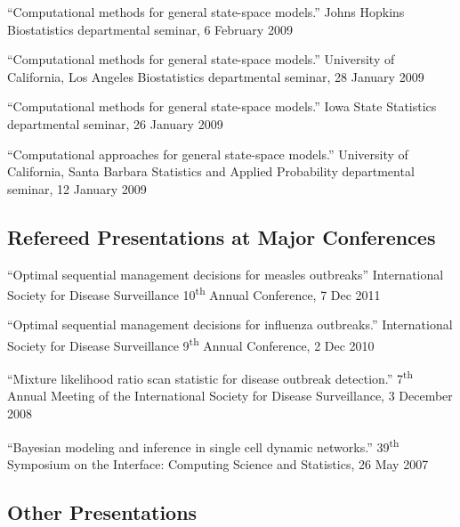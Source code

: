 \documentclass[overlapped,line]{res}
\newcommand{\sinceappt}{}
\begin{document}
\begin{resume}
{``Computational methods for general state-space models.'' Johns Hopkins Biostatistics departmental seminar, 6 February 2009 

``Computational methods for general state-space models.'' University of California, Los Angeles Biostatistics departmental seminar, 28 January 2009 

``Computational methods for general state-space models.'' Iowa State Statistics  departmental seminar, 26 January 2009 

``Computational approaches for general state-space models.'' University of California, Santa Barbara Statistics and Applied Probability departmental seminar, 12 January 2009 
}

\subsection{\bf Refereed Presentations at Major Conferences} \vspace{-0.2in}

{\small 

``Optimal sequential management decisions for measles outbreaks'' International Society for Disease Surveillance 10\textsuperscript{th} Annual Conference, 7 Dec 2011 

\sinceappt

``Optimal sequential management decisions for influenza outbreaks.'' International Society for Disease Surveillance 9\textsuperscript{th} Annual Conference, 2 Dec 2010 

``Mixture likelihood ratio scan statistic for disease outbreak detection.'' 7\textsuperscript{th} Annual Meeting of the International Society for Disease Surveillance, 3 December 2008 

``Bayesian modeling and inference in single cell dynamic networks.'' 39\textsuperscript{th} Symposium on the Interface: Computing Science and Statistics, 26 May 2007 

}

\subsection{\bf Other Presentations} \vspace{-0.2in}

%


\end{resume}
\end{document}

